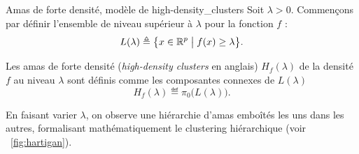\begin{Definition}{Amas de forte densité, modèle de  \cite{hartigan75}}{high-density_clusters}
Soit $\lambda > 0$. Commençons par définir l'ensemble de niveau supérieur à $\lambda$ pour la fonction $f$ :
\[
    L(\lambda) \triangleq \bigl\{ x \in \mathbb R^p   \bigm|   f(x) \ge \lambda \bigr\}.
\]

Les amas de forte densité (\emph{high-density clusters} en anglais) $H_f(\lambda)$ de la densité $f$ au niveau $\lambda$ sont définis comme les composantes connexes de $L(\lambda)$
\[
\boxed{
H_f(\lambda) \eqdef \pi_0 \big( L(\lambda)\bigr).
}
\]
\end{Definition}

En faisant varier $\lambda$, on observe une hiérarchie d'amas emboîtés les uns dans les autres, formalisant mathématiquement le clustering hiérarchique (voir \Fig~\ref{fig:hartigan}). %



